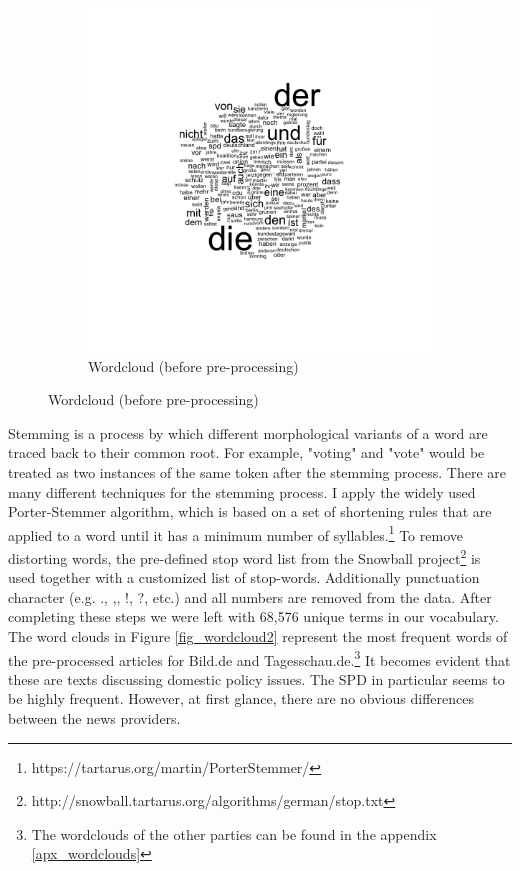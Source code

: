 \documentclass[12pt,a4paper,notitlepage]{article}
\begin{document}
\begin{figure}[H]\label{fig_wordcloud1}
	\begin{center}
		\begin{subfigure}[normla]{0.7\textwidth}
			\includegraphics[width=\textwidth]{../figs/wordcloud.png}
			\caption{Wordcloud (before pre-processing)}
		\end{subfigure}
	\end{center}
\end{figure}

Stemming is a process by which different morphological variants of a word are traced back to their common root. For example, "voting" and "vote" would be treated as two instances of the same token after the stemming process. There are many different techniques for the stemming process. I apply the widely used Porter-Stemmer algorithm, which is based on a set of shortening rules that are applied to a word until it has a minimum number of syllables.\footnote{https://tartarus.org/martin/PorterStemmer/} To remove distorting words, the pre-defined stop word list from the Snowball project\footnote{http://snowball.tartarus.org/algorithms/german/stop.txt} is used together with a customized list of stop-words. Additionally punctuation character (e.g. ., ,, !, ?, etc.) and all numbers are removed from the data. After completing these steps we were left with 68,576 unique terms in our vocabulary. The word clouds in Figure \ref{fig_wordcloud2} represent the most frequent words of the pre-processed articles for Bild.de and Tagesschau.de.\footnote{The wordclouds of the other parties can be found in the appendix \ref{apx_wordclouds}} It becomes evident that these are texts discussing domestic policy issues. The SPD in particular seems to be highly frequent. However, at first glance, there are no obvious differences between the news providers.  
\end{document}
